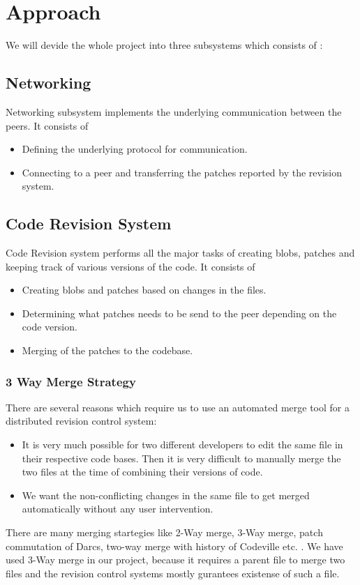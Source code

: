 \documentclass[]{article}
\begin{document}
\section{Approach}
We will devide the whole project into three subsystems which consists of :

\subsection{Networking}
Networking subsystem implements the underlying communication between the
peers. It consists of
\begin{itemize}
\item Defining the underlying protocol for communication.
\item Connecting to a peer and transferring the patches reported by the
  revision system.
\end{itemize}
\subsection{Code Revision System}
Code Revision system performs all the major tasks of creating blobs, patches and
keeping track of various versions of the code. It consists of
\begin{itemize}
\item Creating blobs and patches based on changes in the files.
\item Determining what patches needs to be send to the peer depending on the
  code version.
\item Merging of the patches to the codebase.
\end{itemize}
\subsubsection{3 Way  Merge Strategy}
There are several reasons which require us to use an automated merge tool for a distributed revision control system:
\begin{itemize}
\item It is very much possible for two different developers to edit the same file in their respective code bases. Then it is very difficult to manually merge the two files at the time of combining their versions of code.
\item We want the non-conflicting changes in the same file to get merged automatically without any user intervention.
\end{itemize}

There are many merging startegies like 2-Way merge, 3-Way merge, patch commutation of Darcs,  two-way merge with history of Codeville etc. \cite{WIKIMERGE}.
We have used 3-Way merge in our project, because it requires a parent file to merge two files and the revision control systems mostly gurantees existense of such a file.
\end{document}
